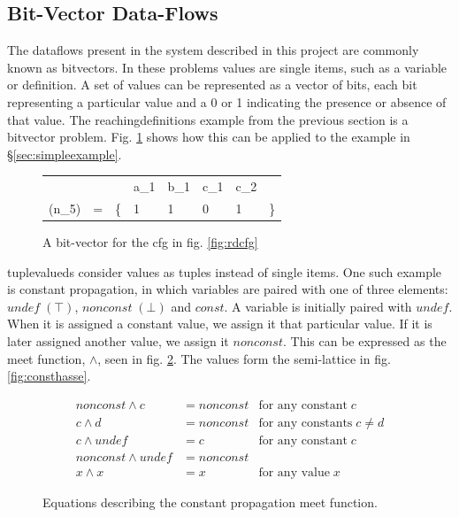 \documentclass[bsc,twoside,singlespacing,parskip,logo,notimes,normalheadings]{infthesis}
\begin{document}
        \subsection{Bit-Vector Data-Flows}
        
        The \gls{dataflow}s present in the system described in this
        project are commonly known as \gls{bitvector}s. In these
        problems values are single items, such as a variable or
        definition. A set of values can be represented as a vector of
        bits, each bit representing a particular value and a 0 or 1
        indicating the presence or absence of that value. The
        \gls{reachingdefinition}s example from the previous section is
        a \gls{bitvector} problem. Fig. \ref{fig:bitvector} shows how
        this can be applied to the example in
        \S\ref{sec:simpleexample}.

        \begin{figure}[!ht]
          \centering
          \begin{tabular}{M{r} M{c} T{r} T{c} T{c} T{c} T{c} T{l}}
                            &   &    & a_1 & b_1 & c_1 & c_2 &    \\
            (n_5) & = & \{ & 1   & 1   & 0   & 1   & \} \\
          \end{tabular}
          \caption{A bit-vector for the \gls{cfg} in fig. \ref{fig:rdcfg}}\label{fig:bitvector}
        \end{figure}

        \Gls{tuplevalued}s consider values as tuples instead of single
        items. One such example is constant propagation, in which
        variables are paired with one of three elements:
        $undef\;(\top)$, $nonconst\;(\bot)$ and $const$. A variable is
        initially paired with $undef$. When it is assigned a constant
        value, we assign it that particular value. If it is later
        assigned another value, we assign it $nonconst$. This can be
        expressed as the meet function, $\land$, seen in
        fig. \ref{fig:constmeet}. The values form the semi-lattice in
        fig. \ref{fig:consthasse}.

        \begin{figure}[h]
        \begin{align*}
        nonconst \land c     & = nonconst & \text{for any constant} \; c         \\
        c \land d            & = nonconst & \text{for any constants} \; c \neq d \\
        c \land undef        & = c        & \text{for any constant} \; c         \\
        nonconst \land undef & = nonconst &                                      \\
        x \land x            & = x        & \text{for any value} \; x
        \end{align*}
        \caption{Equations describing the constant propagation meet function.}
        \label{fig:constmeet}
        \end{figure}
        
\end{document}
